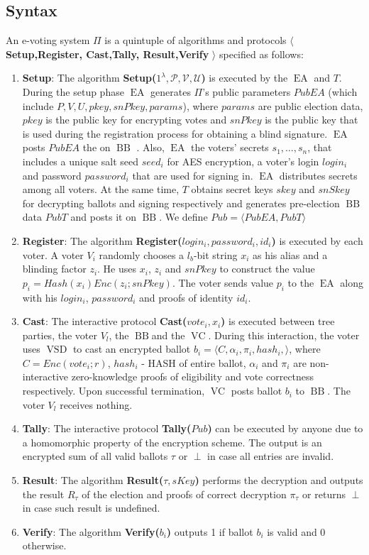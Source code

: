 \documentclass[12pt]{article}
\DeclareMathOperator{\vsd}{VSD}
\DeclareMathOperator{\ea}{EA}
\DeclareMathOperator{\bb}{BB}
\DeclareMathOperator{\voc}{VC}
\begin{document}
\subsection{Syntax}
An e-voting system $\Pi$ is a quintuple of algorithms and protocols $\langle$ \textbf{Setup,Register, Cast,Tally, Result,Verify} $\rangle$ specified as follows:
\begin{enumerate}
\item \textbf{Setup}: The algorithm \textbf{Setup($1^{\lambda}, \mathcal{P}, \mathcal{V}, \mathcal{U}$)}  is executed by the $\ea$ and $T$. During the setup phase $\ea$ generates $\Pi$'s public parameters $PubEA$ (which include $P, V, U, pkey, snPkey, params$), where $params$ are public election data, $pkey$ is the public key for encrypting votes and $snPkey$ is the public key that is used during the registration process for obtaining a blind signature. $\ea$ posts  $PubEA$  the on $\bb$ . Also, $\ea$ the voters' secrets $s_1, \dots , s_n$, that includes a unique salt seed $seed_i$ for AES encryption, a voter's login $login_i$ and password $password_i$ that are used for signing in. $\ea$ distributes secrets among all voters. At the same time, $T$  obtains secret keys $skey$ and $snSkey$ for decrypting ballots and signing respectively and generates pre-election $\bb$ data $PubT$ and posts it on $\bb$. We define $Pub = \langle PubEA, PubT \rangle $ 
\item  \textbf{Register}: The algorithm \textbf{Register($login_i,password_i,id_i$)}  is executed by each voter. A voter $V_i$ randomly chooses a $l_b$-bit string $x_i$ as his alias and a blinding factor $z_i$. He uses $x_i$, $z_i$ and $snPkey$ to construct the value $p_i = Hash(x_i)Enc(z_i;snPkey)$. The voter sends value $p_i$ to the $\ea$ along with his $login_i$, $password_i$ and proofs of identity $id_i$.
\item  \textbf{Cast}:  The interactive protocol \textbf{Cast($vote_i,x_i$)} is executed between tree parties, the voter $V_l$, the $\bb$and the $\voc$. During this interaction, the voter uses $\vsd$ to cast an encrypted ballot $b_i = \langle C, \alpha_i, \pi_i, hash_i, \rangle$, where $C=Enc(vote_i;r)$, $hash_i$ - HASH of entire ballot,  $\alpha_i$ and $\pi_i$  are non-interactive zero-knowledge proofs of eligibility and vote correctness respectively. Upon successful termination, $\voc$ posts ballot $b_i$ to $\bb$. The voter $V_l$ receives nothing.
\item  \textbf{Tally}: The interactive protocol \textbf{Tally($Pub$)}  can be executed by anyone due to a homomorphic property of the encryption scheme. The output is an encrypted sum of all valid ballots $\tau$ or $\perp$ in case all entries are invalid.
\item   \textbf{Result}: The algorithm  \textbf{Result($\tau, sKey$)} performs the decryption and outputs the result $R_{\tau}$ of the election and proofs of correct decryption $\pi_{\tau}$ or returns  $\perp$in case such result is undefined.
\item  \textbf{Verify}: The algorithm \textbf{Verify($b_i$)} outputs 1 if ballot $b_i$ is valid and 0 otherwise.
\end{enumerate}
\end{document}
